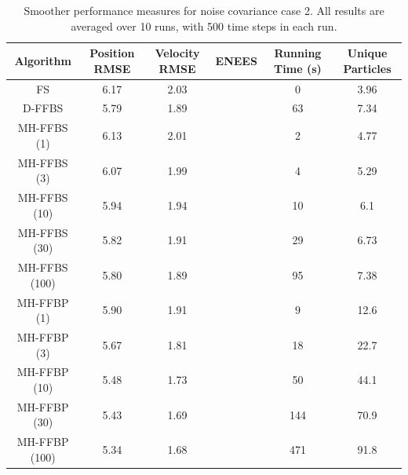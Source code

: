 \documentclass[10pt,twocolumn,twoside]{IEEEtran}
\begin{document}
\begin{table}[!t]%
\renewcommand{\arraystretch}{1.3}
\caption{Smoother performance measures for noise covariance case 2. All results are averaged over 10 runs, with 500 time steps in each run.}
\label{tab:case2_performance}
{\scriptsize
\centering
\begin{tabular}{|c||c|c|c|c|c|}
\hline
Algorithm & \begin{minipage}[c]{0.9cm} Position RMSE \end{minipage} & \begin{minipage}[c]{0.9cm}  Velocity RMSE \end{minipage} & \begin{minipage}[c]{0.9cm}  ENEES \end{minipage} & \begin{minipage}[c]{0.9cm}  Running Time (s) \end{minipage} & \begin{minipage}[c]{0.9cm}  Unique Particles \end{minipage} \\
\hline
FS              & 6.17 & 2.03 &  & 0 & 3.96 \\
D-FFBS         & 5.79 & 1.89 &  & 63 & 7.34 \\
\hline
MH-FFBS (1)    & 6.13 & 2.01 &  & 2 & 4.77 \\
MH-FFBS (3)    & 6.07 & 1.99 &  & 4 & 5.29 \\
MH-FFBS (10)   & 5.94 & 1.94 &  & 10 & 6.1 \\
MH-FFBS (30)   & 5.82 & 1.91 &  & 29 & 6.73 \\
MH-FFBS (100)  & 5.80 & 1.89 &  & 95 & 7.38 \\
\hline
MH-FFBP (1)    & 5.90 & 1.91 &  & 9 & 12.6 \\
MH-FFBP (3)    & 5.67 & 1.81 &  & 18 & 22.7 \\
MH-FFBP (10)   & 5.48 & 1.73 &  & 50 & 44.1 \\
MH-FFBP (30)   & 5.43 & 1.69 &  & 144 & 70.9 \\
MH-FFBP (100)  & 5.34 & 1.68 &  & 471 & 91.8 \\
\hline
\end{tabular}
}
\end{table}
\end{document}
